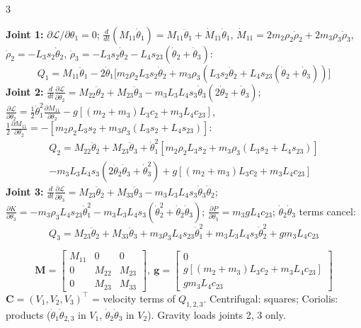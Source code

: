\begin{multicols}{3}
\begin{examq}
\end{examq}
\begin{examq}
\textbf{Joint 1:} $\partial\mathcal L/\partial\theta_1=0$; $\frac d{dt}(M_{11}\dot\theta_1)=M_{11}\ddot\theta_1+\dot M_{11}\dot\theta_1$, $\dot M_{11}=2m_2\rho_2\dot\rho_2+2m_3\rho_3\dot\rho_3$, $\dot\rho_2=-L_3s_2\dot\theta_2$, $\dot\rho_3=-L_3s_2\dot\theta_2-L_4s_{23}(\dot\theta_2{+}\dot\theta_3)$:
\[Q_1=M_{11}\ddot\theta_1-2\dot\theta_1\big[m_2\rho_2L_3s_2\dot\theta_2+m_3\rho_3(L_3s_2\dot\theta_2+L_4s_{23}(\dot\theta_2{+}\dot\theta_3))\big]\]
\textbf{Joint 2:} $\frac d{dt}\frac{\partial\mathcal L}{\partial\dot\theta_2}=M_{22}\ddot\theta_2+M_{23}\ddot\theta_3-m_3L_3L_4s_3\dot\theta_3(2\dot\theta_2{+}\dot\theta_3)$; $\frac{\partial\mathcal L}{\partial\theta_2}=\tfrac12\dot\theta_1^2\frac{\partial M_{11}}{\partial\theta_2}-g[(m_2{+}m_3)L_3c_2+m_3L_4c_{23}]$, $\tfrac12\frac{\partial M_{11}}{\partial\theta_2}=-[m_2\rho_2L_3s_2+m_3\rho_3(L_3s_2{+}L_4s_{23})]$:
\begin{multline*}Q_2=M_{22}\ddot\theta_2+M_{23}\ddot\theta_3+\dot\theta_1^2[m_2\rho_2L_3s_2+m_3\rho_3(L_3s_2{+}L_4s_{23})]\\-m_3L_3L_4s_3(2\dot\theta_2\dot\theta_3+\dot\theta_3^2)+g[(m_2{+}m_3)L_3c_2+m_3L_4c_{23}]\end{multline*}
\textbf{Joint 3:} $\frac d{dt}\frac{\partial\mathcal L}{\partial\dot\theta_3}=M_{23}\ddot\theta_2+M_{33}\ddot\theta_3-m_3L_3L_4s_3\dot\theta_3\dot\theta_2$; $\frac{\partial K}{\partial\theta_3}=-m_3\rho_3L_4s_{23}\dot\theta_1^2-m_3L_3L_4s_3(\dot\theta_2^2{+}\dot\theta_2\dot\theta_3)$; $\frac{\partial P}{\partial\theta_3}=m_3gL_4c_{23}$; $\dot\theta_2\dot\theta_3$ terms cancel:
\[Q_3=M_{23}\ddot\theta_2+M_{33}\ddot\theta_3+m_3\rho_3L_4s_{23}\dot\theta_1^2+m_3L_3L_4s_3\dot\theta_2^2+gm_3L_4c_{23}\]
\end{examq}
\begin{examq}
\[\mathbf M=\begin{bmatrix}M_{11}&0&0\\0&M_{22}&M_{23}\\0&M_{23}&M_{33}\end{bmatrix},\ \mathbf g=\begin{bmatrix}0\\g[(m_2{+}m_3)L_3c_2+m_3L_4c_{23}]\\gm_3L_4c_{23}\end{bmatrix}\]
$\mathbf C=(V_1,V_2,V_3)^\top$ = velocity terms of $Q_{1,2,3}$. Centrifugal: squares; Coriolis: products ($\dot\theta_1\dot\theta_{2,3}$ in $V_1$, $\dot\theta_2\dot\theta_3$ in $V_2$). Gravity loads joints 2, 3 only.\\

\end{examq}
\end{multicols}
